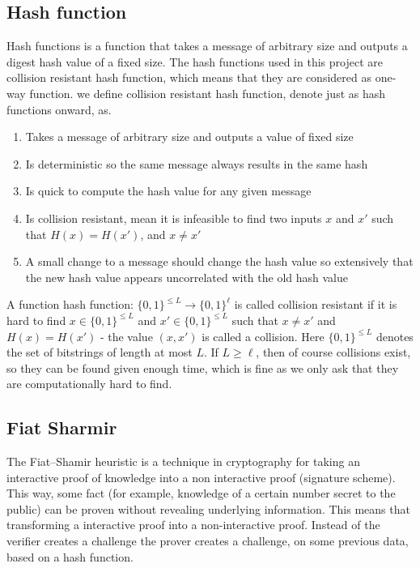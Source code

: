 \subsection{Hash function}
Hash functions is a function that takes a message of arbitrary size and outputs a digest hash value of a fixed size. The hash functions used in this project are collision resistant hash function, which means that they are considered as one-way function. we define collision resistant hash function, denote just as hash functions onward, as.

\begin{defi}
\begin{enumerate}
    \item Takes a message of arbitrary size and outputs a value of fixed size
    \item Is deterministic so the same message always results in the same hash
    \item Is quick to compute the hash value for any given message
    \item Is collision resistant, mean it is infeasible to find two inputs $x$ and $x'$ such that $H(x) = H(x')$, and $x \neq x'$
    \item A small change to a message should change the hash value so extensively that the new hash value appears uncorrelated with the old hash value
\end{enumerate}
\end{defi}

A function hash function: $\{0,1\}^{\leq L} \rightarrow \{0,1\}^\ell$ is called collision resistant if it is hard to find $x \in \{0,1\}^{\leq L}$ and $x' \in \{0,1\}^{\leq L}$ such that $x \neq x'$ and $H(x)=H(x')$ - the value $(x,x')$ is called a collision. Here $\{0,1\}^{\leq L}$ denotes the set of bitstrings of length at most $L$. If $L \geq \ell$, then of course collisions exist, so they can be found given enough time, which is fine as we only ask that they are computationally hard to find.  

\subsection{Fiat Sharmir}
The Fiat–Shamir heuristic is a technique in cryptography for taking an interactive proof of knowledge into a non interactive proof (signature scheme). This way, some fact (for example, knowledge of a certain number secret to the public) can be proven without revealing underlying information. This means that transforming a interactive proof into a non-interactive proof. Instead of the verifier creates a challenge the prover creates a challenge, on some previous data, based on a hash function.\\

